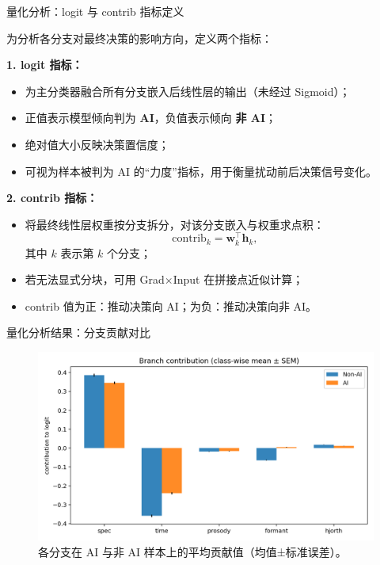 \documentclass[aspectratio=169]{beamer}
\providecommand{\paragraph}[1]{\smallskip\textbf{#1}\par}
\begin{document}
\begin{frame}{量化分析：logit 与 contrib 指标定义}

为分析各分支对最终决策的影响方向，定义两个指标：

\vspace{0.6em}
\textbf{1. logit 指标：}
\begin{itemize}
  \item 为主分类器融合所有分支嵌入后线性层的输出（未经过 Sigmoid）；
  \item 正值表示模型倾向判为 \textbf{AI}，负值表示倾向 \textbf{非 AI}；
  \item 绝对值大小反映决策置信度；
  \item 可视为样本被判为 AI 的“力度”指标，用于衡量扰动前后决策信号变化。
\end{itemize}

\vspace{0.6em}
\textbf{2. contrib 指标：}
\begin{itemize}
  \item 将最终线性层权重按分支拆分，对该分支嵌入与权重求点积：
    \[
      \text{contrib}_k = \mathbf{w}_k^\top \mathbf{h}_k,
    \]
    其中 $k$ 表示第 $k$ 个分支；
  \item 若无法显式分块，可用 Grad$\times$Input 在拼接点近似计算；
  \item contrib 值为正：推动决策向 AI；为负：推动决策向非 AI。
\end{itemize}

\end{frame}

\begin{frame}{量化分析结果：分支贡献对比}
\begin{figure}
  \centering
  \includegraphics[width=0.8\linewidth]{images_in_paper/contrib_means_by_class.png}
  \caption{各分支在 AI 与非 AI 样本上的平均贡献值（均值±标准误差）。}
  \label{fig:contrib_means}
\end{figure}
\end{frame}
\end{document}
